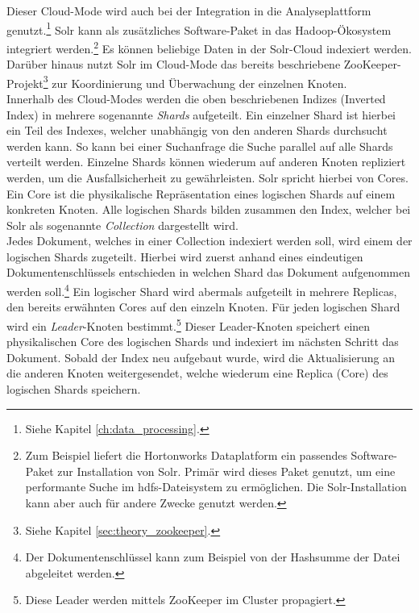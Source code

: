 \noindent
Dieser Cloud-Mode wird auch bei der Integration in die Analyseplattform genutzt.\footnote{Siehe Kapitel \ref{ch:data_processing}.} Solr kann als zusätzliches Software-Paket in das Hadoop-Ökosystem integriert werden.\footnote{Zum Beispiel liefert die Hortonworks Dataplatform ein passendes Software-Paket zur Installation von Solr. Primär wird dieses Paket genutzt, um eine performante Suche im \gls{hdfs}-Dateisystem zu ermöglichen. Die Solr-Installation kann aber auch für andere Zwecke genutzt werden.} Es können beliebige Daten in der Solr-Cloud indexiert werden. Darüber hinaus nutzt Solr im Cloud-Mode das bereits beschriebene ZooKeeper-Projekt\footnote{Siehe Kapitel \ref{sec:theory_zookeeper}.} zur Koordinierung und Überwachung der einzelnen Knoten.\\
Innerhalb des Cloud-Modes werden die oben beschriebenen Indizes (Inverted Index) in mehrere sogenannte \textit{Shards} aufgeteilt. Ein einzelner Shard ist hierbei ein Teil des Indexes, welcher unabhängig von den anderen Shards durchsucht werden kann. So kann bei einer Suchanfrage die Suche parallel auf alle Shards verteilt werden. Einzelne Shards können wiederum auf anderen Knoten repliziert werden, um die Ausfallsicherheit zu gewährleisten. Solr spricht hierbei von Cores. Ein Core ist die physikalische Repräsentation eines logischen Shards auf einem konkreten Knoten. Alle logischen Shards bilden zusammen den Index, welcher bei Solr als sogenannte \textit{Collection} dargestellt wird.\cite{solr_cloud_scaling}\\

\noindent
Jedes Dokument, welches in einer Collection indexiert werden soll, wird einem der logischen Shards zugeteilt. Hierbei wird zuerst anhand eines eindeutigen Dokumentenschlüssels entschieden in welchen Shard das Dokument aufgenommen werden soll.\footnote{Der Dokumentenschlüssel kann zum Beispiel von der Hashsumme der Datei abgeleitet werden.} Ein logischer Shard wird abermals aufgeteilt in mehrere Replicas, den bereits erwähnten Cores auf den einzeln Knoten. Für jeden logischen Shard wird ein \textit{Leader}-Knoten bestimmt.\footnote{Diese Leader werden mittels ZooKeeper im Cluster propagiert.} Dieser Leader-Knoten speichert einen physikalischen Core des logischen Shards und indexiert im nächsten Schritt das Dokument. Sobald der Index neu aufgebaut wurde, wird die Aktualisierung an die anderen Knoten weitergesendet, welche wiederum eine Replica (Core) des logischen Shards speichern.\cite[S. 867 ff]{solr_ref_guide}\\ 


